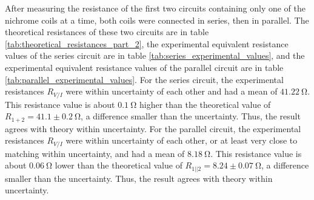 \documentclass[12pt]{iopart} %
\gdef\units#1{~\mathrm{#1}}
\begin{document}
After measuring the resistance of the first two circuits containing only one of the nichrome coils at a time, both coils were connected in series, then in parallel.
The theoretical resistances of these two circuits are in table \ref{tab:theoretical_resistances_part_2}, the experimental equivalent resistance values of the series circuit are in table \ref{tab:series_experimental_values}, and the experimental equivalent resistance values of the parallel circuit are in table \ref{tab:parallel_experimental_values}.
For the series circuit, the experimental resistances $R_{V/I}$ were within uncertainty of each other and had a mean of $41.22 \units{\Omega}$.
This resistance value is about $0.1 \units{\Omega}$ higher than the theoretical value of $R_{1+2} = 41.1 \pm 0.2 \units{\Omega}$, a difference smaller than the uncertainty.
Thus, the result agrees with theory within uncertainty. 
For the parallel circuit, the experimental resistances $R_{V/I}$ were within uncertainty of each other, or at least very close to matching within uncertainty, and had a mean of $8.18 \units{\Omega}$.
This resistance value is about $0.06 \units{\Omega}$ lower than the theoretical value of $R_{1||2} = 8.24 \pm 0.07 \units{\Omega}$, a difference smaller than the uncertainty.
Thus, the result agrees with theory within uncertainty.
\end{document}
